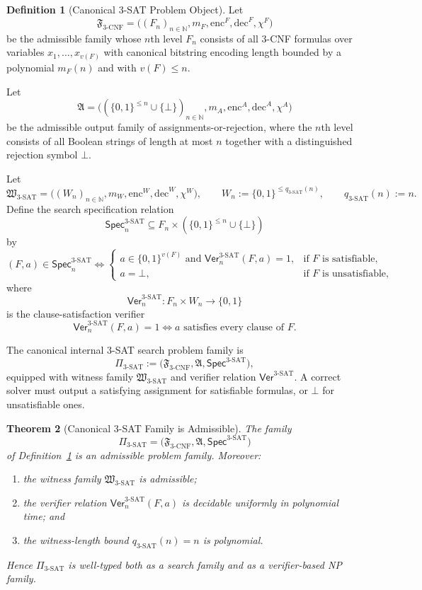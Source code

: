 \documentclass[11pt]{article}
\newtheorem{theorem}{Theorem}[section]
\theoremstyle{definition}
\newtheorem{definition}[theorem]{Definition}
\theoremstyle{remark}
\newcommand{\Spec}{\mathsf{Spec}}
\begin{document}
\begin{definition}[Canonical 3-SAT Problem Object]\label{def-threshold-random-3sat-family}
Let
\[
\mathfrak F_{3\text{-CNF}} = \bigl((F_n)_{n \in \mathbb N}, m_F, \mathrm{enc}^F, \mathrm{dec}^F, \chi^F\bigr)
\]
be the admissible family whose $n$th level $F_n$ consists of all $3$-CNF formulas over variables $x_1,\dots,x_{v(F)}$ with canonical bitstring encoding length bounded by a polynomial $m_F(n)$ and with $v(F) \le n$.

Let
\[
\mathfrak A = \bigl((\{0,1\}^{\le n} \cup \{\bot\})_{n \in \mathbb N}, m_A, \mathrm{enc}^A, \mathrm{dec}^A, \chi^A\bigr)
\]
be the admissible output family of assignments-or-rejection, where the $n$th level consists of all Boolean strings of length at most $n$ together with a distinguished rejection symbol $\bot$.

Let
\[
\mathfrak W_{3\text{-SAT}} = \bigl((W_n)_{n \in \mathbb N}, m_W, \mathrm{enc}^W, \mathrm{dec}^W, \chi^W\bigr),
\qquad
W_n := \{0,1\}^{\le q_{3\text{-SAT}}(n)},
\qquad
q_{3\text{-SAT}}(n) := n.
\]
Define the search specification relation
\[
\Spec_n^{3\text{-SAT}} \subseteq F_n \times (\{0,1\}^{\le n} \cup \{\bot\})
\]
by
\[
(F,a) \in \Spec_n^{3\text{-SAT}}
\iff
\begin{cases}
a \in \{0,1\}^{v(F)} \text{ and } \mathsf{Ver}^{3\text{-SAT}}_n(F,a) = 1, & \text{if } F \text{ is satisfiable},\\
a = \bot, & \text{if } F \text{ is unsatisfiable},
\end{cases}
\]
where
\[
\mathsf{Ver}^{3\text{-SAT}}_n : F_n \times W_n \to \{0,1\}
\]
is the clause-satisfaction verifier
\[
\mathsf{Ver}^{3\text{-SAT}}_n(F,a) = 1
\iff
a \text{ satisfies every clause of } F.
\]

The canonical internal $3$-SAT search problem family is
\[
\Pi_{3\text{-SAT}} := \bigl(\mathfrak F_{3\text{-CNF}}, \mathfrak A, \Spec^{3\text{-SAT}}\bigr),
\]
equipped with witness family $\mathfrak W_{3\text{-SAT}}$ and verifier relation $\mathsf{Ver}^{3\text{-SAT}}$. A correct solver must output a satisfying assignment for satisfiable formulas, or $\bot$ for unsatisfiable ones.
\end{definition}

\begin{theorem}[Canonical 3-SAT Family is Admissible]\label{thm-canonical-3sat-admissible}
The family
\[
\Pi_{3\text{-SAT}} = \bigl(\mathfrak F_{3\text{-CNF}}, \mathfrak A, \Spec^{3\text{-SAT}}\bigr)
\]
of Definition~\ref{def-threshold-random-3sat-family} is an admissible problem family. Moreover:
\begin{enumerate}
\item the witness family $\mathfrak W_{3\text{-SAT}}$ is admissible;
\item the verifier relation $\mathsf{Ver}^{3\text{-SAT}}_n(F,a)$ is decidable uniformly in polynomial time; and
\item the witness-length bound $q_{3\text{-SAT}}(n) = n$ is polynomial.
\end{enumerate}
Hence $\Pi_{3\text{-SAT}}$ is well-typed both as a search family and as a verifier-based NP family.
\end{theorem}
\end{document}
